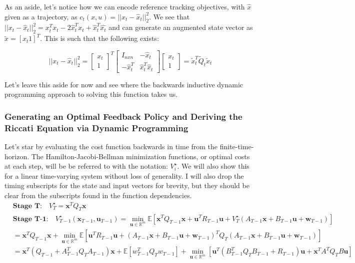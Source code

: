 \documentclass[conf]{new-aiaa}
\begin{document}
\begin{doublespace}
As an aside, let's notice how we can encode reference tracking objectives, with $\hat{x}$ given as a trajectory, as $c_t(x,u)=||x_t - \hat{x}_t||_2^2$. We see that $||x_t - \hat{x}_t||_2^2 = x_t^Tx_t - 2\hat{x}_t^Tx_t + \hat{x}_t^T\hat{x_t}$ and can generate an augmented state vector as $\tilde{x}=[x_t 1]^T$. This is such that the following exists:
\begin{singlespace}
\begin{equation}
||x_t - \hat{x}_t||_2^2 =
\begin{bmatrix} x_t\\ 1 \end{bmatrix}^T
\begin{bmatrix} I_{nxn} &-\hat{x}_t \\ -\hat{x}_t^T &\hat{x}_t^T\hat{x}_t\end{bmatrix}
\begin{bmatrix} x_t \\ 1\end{bmatrix}
= \tilde{x}_t^T \tilde{Q}_t \tilde{x}_t
\end{equation}
\end{singlespace}

Let's leave this aside for now and see where the backwards inductive dynamic programming approach to solving this function takes us.
\subsubsection{Generating an Optimal Feedback Policy and Deriving the Riccati Equation via Dynamic Programming}
Let's star by evaluating the cost function backwards in time from the finite-time-horizon. The Hamilton-Jacobi-Bellman minimization functions, or optimal costs at each step, will be be referred to with the notation: $V_i^\star$. We will also show this for a linear time-varying system without loss of generality. I will also drop the timing subscripts for the state and input vectors for brevity, but they should be clear from the subscripts found in the function dependencies.
\begin{align}
&\textbf{Stage T:} \quad V_T^\star = \mathbf{x}^TQ_T\mathbf{x}  \\
&\textbf{Stage T-1:} \quad V_{T-1}^\star(\mathbf{x}_{T-1},\mathbf{u}_{T-1}) = \min_{\mathbf{u} \in \mathbb{R}^m} \mathbb {E} \left[\mathbf{x}^TQ_{T-1}\mathbf{x} + \mathbf{u}^TR_{T-1}\mathbf{u} + V_T^\star(A_{T-1}\mathbf{x} + B_{T-1}\mathbf{u} + \mathbf{w}_{T-1}) \right] \\
& = \mathbf{x}^TQ_{T-1}\mathbf{x} + \min_{\mathbf{u} \in \mathbb{R}^m} \mathbb{E} \left[\mathbf{u}^TR_{T-1}\mathbf{u} + (A_{T-1}\mathbf{x} + B_{T-1}\mathbf{u} + \mathbf{w}_{T-1})^TQ_T(A_{T-1}\mathbf{x}+ B_{T-1}\mathbf{u} + \mathbf{w}_{T-1})  \right] \\
& = \mathbf{x}^T(Q_{T-1} + A_{T-1}^TQ_TA_{T-1})\mathbf{x} + \mathbb{E}\left[w_{T-1}^TQ_Tw_{T-1} \right] + \min_{\mathbf{u} \in \mathbb{R}^m} \left[ \mathbf{u}^T(B_{T-1}^TQ_TB_{T-1} + R_{T-1})\mathbf{u} + \mathbf{x}^TA^TQ_TB\mathbf{u} \right]
\label{eqn4}
\end{align}


\end{doublespace}
\end{document}
